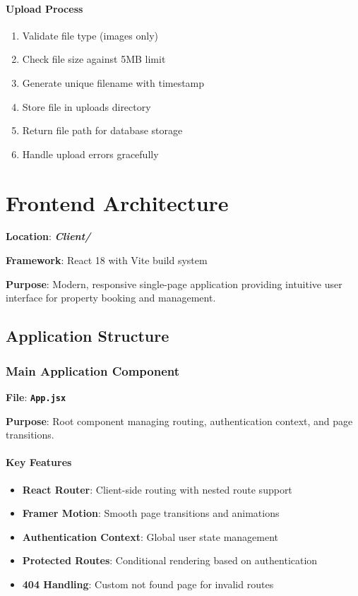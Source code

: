 \documentclass[12pt,a4paper]{article}
\newcommand{\file}[1]{\textbf{\texttt{#1}}}
\newcommand{\folder}[1]{\textbf{\textit{#1}}}
\begin{document}
\paragraph{Upload Process}
\begin{enumerate}
\item Validate file type (images only)
\item Check file size against 5MB limit
\item Generate unique filename with timestamp
\item Store file in uploads directory
\item Return file path for database storage
\item Handle upload errors gracefully
\end{enumerate}

\section{Frontend Architecture}
\label{sec:frontend-architecture}

\textbf{Location}: \folder{Client/}

\textbf{Framework}: React 18 with Vite build system

\textbf{Purpose}: Modern, responsive single-page application providing intuitive user interface for property booking and management.

\subsection{Application Structure}
\label{subsec:app-structure}

\subsubsection{Main Application Component}
\label{subsubsec:main-app}

\textbf{File}: \file{App.jsx}

\textbf{Purpose}: Root component managing routing, authentication context, and page transitions.

\paragraph{Key Features}
\begin{itemize}
\item \textbf{React Router}: Client-side routing with nested route support
\item \textbf{Framer Motion}: Smooth page transitions and animations
\item \textbf{Authentication Context}: Global user state management
\item \textbf{Protected Routes}: Conditional rendering based on authentication
\item \textbf{404 Handling}: Custom not found page for invalid routes
\end{itemize}
\end{document}
